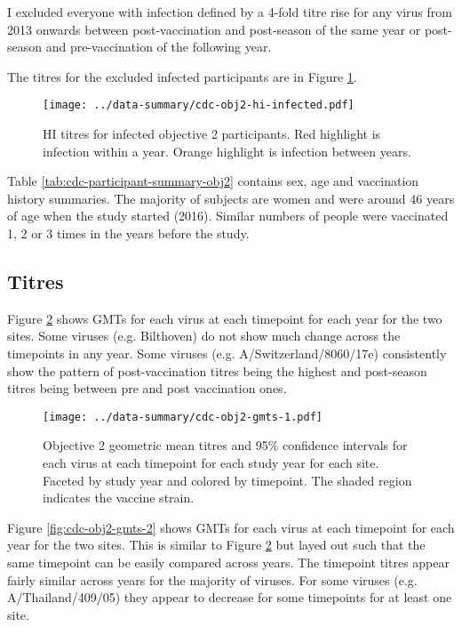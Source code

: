 \documentclass[12pt]{article}
\begin{document}
I excluded everyone with infection defined by a 4-fold titre rise for any virus
from 2013 onwards between post-vaccination and post-season of the same year
or post-season and pre-vaccination of the following year.

The titres for the excluded infected participants are in Figure \ref{fig:cdc-obj2-hi-infected}.

\begin{figure}
	\texttt{[image: ../data-summary/cdc-obj2-hi-infected.pdf]}
	\caption{
		HI titres for infected objective 2 participants. Red highlight is infection within a year. Orange highlight is infection between years.
	}
	\label{fig:cdc-obj2-hi-infected}
\end{figure}

Table \ref{tab:cdc-participant-summary-obj2} contains sex, age and
vaccination history summaries.
The majority of subjects are
women and were around 46 years of age when the study started (2016).
Similar numbers of people were vaccinated 1, 2 or 3 times in the years before
the study.



\subsection{Titres}

Figure \ref{fig:cdc-obj2-gmts-1} shows GMTs for each virus at each timepoint for each year for the two sites.
Some viruses (e.g. Bilthoven) do not show much change across the timepoints in
any year. Some viruses (e.g. A/Switzerland/8060/17e) consistently show the pattern of post-vaccination titres being the highest and post-season titres being between pre and post vaccination ones.

\begin{figure}
	\texttt{[image: ../data-summary/cdc-obj2-gmts-1.pdf]}
	\caption{Objective 2 geometric mean titres and 95\% confidence intervals for each virus at each timepoint for each study year for each site. Faceted by study year and colored by timepoint. The shaded region indicates the vaccine strain.}
	\label{fig:cdc-obj2-gmts-1}
\end{figure}

Figure \ref{fig:cdc-obj2-gmts-2} shows GMTs for each virus at each timepoint for each year for the two sites. This is similar to Figure \ref{fig:cdc-obj2-gmts-1} but layed out such that the same timepoint can be easily compared across years. The timepoint titres appear fairly similar across years for the majority of viruses. For some viruses (e.g. A/Thailand/409/05) they appear to decrease for some timepoints for at least one site.
\end{document}
